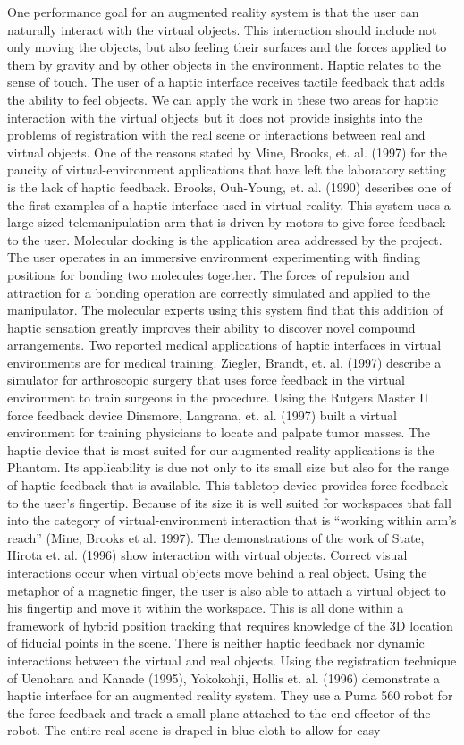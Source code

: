 One performance goal for an augmented reality system is that the user can naturally interact with the virtual objects. This interaction should include not only moving the objects, but also feeling their surfaces and the forces applied to them by gravity and by other objects in the environment. Haptic relates to the sense of touch. The user of a haptic interface receives tactile feedback that adds the ability to feel objects. We can apply the work in these two areas for haptic interaction with the virtual objects but it does not provide insights into the problems of registration with the real scene or interactions between real and virtual objects. One of the reasons stated by Mine, Brooks, et. al. (1997) for the paucity of virtual-environment applications that have left the laboratory setting is the lack of haptic feedback. Brooks, Ouh-Young, et. al. (1990) describes one of the first examples of a haptic interface used in virtual reality. This system uses a large sized telemanipulation arm that is driven by motors to give force feedback to the user. Molecular docking is the application area addressed by the project. The user operates in an immersive environment experimenting with finding positions for bonding two molecules together. The forces of repulsion and attraction for a bonding operation are correctly simulated and applied to the manipulator. The molecular experts using this system find that this addition of haptic sensation greatly improves their ability to discover novel compound arrangements. Two reported medical applications of haptic interfaces in virtual environments are for medical training. Ziegler, Brandt, et. al. (1997) describe a simulator for arthroscopic surgery that uses force feedback in the virtual environment to train surgeons in the procedure. Using the Rutgers Master II force feedback device Dinsmore, Langrana, et. al. (1997) built a virtual environment for training physicians to locate and palpate tumor masses. The haptic device that is most suited for our augmented reality applications is the Phantom. Its applicability is due not only to its small size but also for the range of haptic feedback that is available. This tabletop device provides force feedback to the user’s fingertip. Because of its size it is well suited for workspaces that fall into the category of virtual-environment interaction that is “working within arm’s reach” (Mine, Brooks et al. 1997). The demonstrations of the work of State, Hirota et. al. (1996) show interaction with virtual objects. Correct visual interactions occur when virtual objects move behind a real object. Using the metaphor of a magnetic finger, the user is also able to attach a virtual object to his fingertip and move it within the workspace. This is all done within a framework of hybrid position tracking that requires knowledge of the 3D location of fiducial points in the scene. There is neither haptic feedback nor dynamic interactions between the virtual and real objects. Using the registration technique of Uenohara and Kanade (1995), Yokokohji, Hollis et. al. (1996) demonstrate a haptic interface for an augmented reality system. They use a Puma 560 robot for the force feedback and track a small plane attached to the end effector of the robot. The entire real scene is draped in blue cloth to allow for easy 